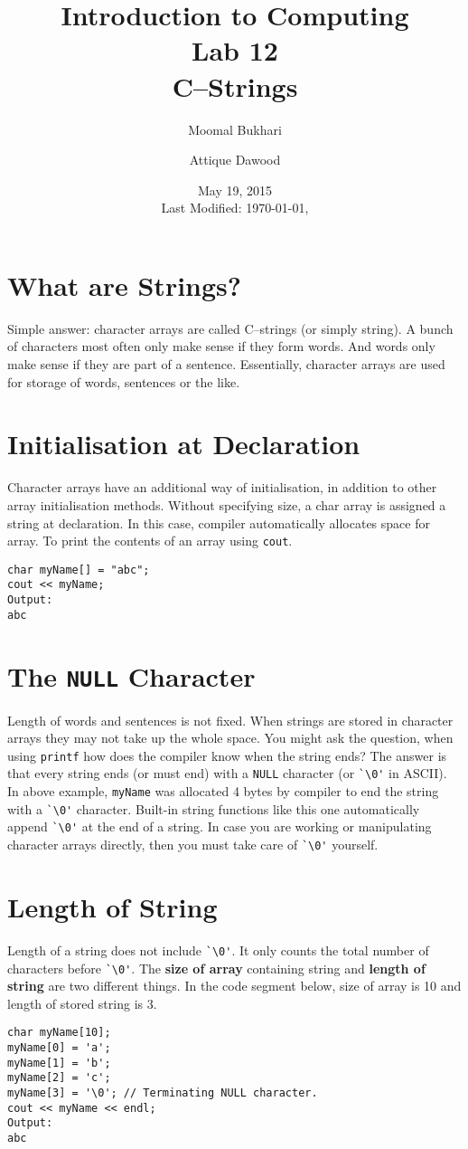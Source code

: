 \documentclass[12pt,a4paper]{article}
\title{Introduction to Computing\\Lab 12\\C--Strings}
\author{Moomal Bukhari\and Attique Dawood}
\date{May 19, 2015\\[0.2cm] Last Modified: \today, \currenttime}
\begin{document}
\maketitle
\section{What are Strings?}
Simple answer: character arrays are called C--strings (or simply string). A bunch of characters most often only make sense if they form words. And words only make sense if they are part of a sentence. Essentially, character arrays are used for storage of words, sentences or the like.
\section{Initialisation at Declaration}
Character arrays have an additional way of initialisation, in addition to other array initialisation methods. Without specifying size, a char array is assigned a string at declaration. In this case, compiler automatically allocates space for array. To print the contents of an array using \texttt{cout}.
\begin{lstlisting}
char myName[] = "abc";
cout << myName;
Output:
abc
\end{lstlisting}
\section{The \texttt{NULL} Character}
Length of words and sentences is not fixed. When strings are stored in character arrays they may not take up the whole space. You might ask the question, when using \texttt{printf} how does the compiler know when the string ends? The answer is that every string ends (or must end) with a \texttt{NULL} character (or \verb|`\0'| in ASCII). In above example, \texttt{myName} was allocated 4 bytes by compiler to end the string with a \verb|`\0'| character. Built-in string functions like this one automatically append \verb|`\0'| at the end of a string. In case you are working or manipulating character arrays directly, then you must take care of \verb|`\0'| yourself.
\section{Length of String}
Length of a string does not include \verb|`\0'|. It only counts the total number of characters before \verb|`\0'|. The \textbf{size of array} containing string and \textbf{length of string} are two different things. In the code segment below, size of array is 10 and length of stored string is 3.
\begin{lstlisting}
char myName[10];
myName[0] = 'a';
myName[1] = 'b';
myName[2] = 'c';
myName[3] = '\0'; // Terminating NULL character.
cout << myName << endl;
Output:
abc
\end{lstlisting}
\end{document}
